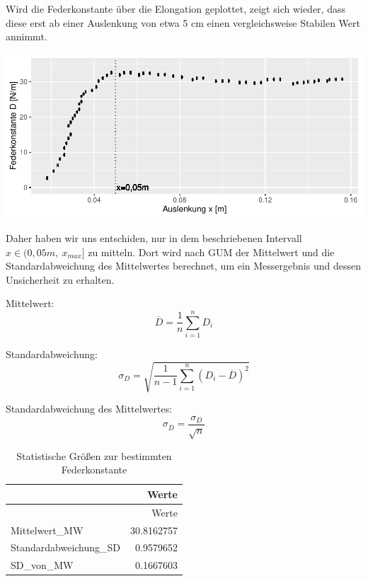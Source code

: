 \documentclass[
  9pt,
]{article}
\begin{document}
Wird die Federkonstante über die Elongation geplottet, zeigt sich
wieder, dass diese erst ab einer Auslenkung von etwa 5 cm einen
vergleichsweise Stabilen Wert annimmt.

\begin{center}\includegraphics{DehnbareStoffe_files/figure-latex/unnamed-chunk-9-1} \end{center}

Daher haben wir uns entschiden, nur in dem beschriebenen Intervall
\(x \in (0,05m,\ x_{max}]\) zu mitteln. Dort wird nach GUM der
Mittelwert und die Standardabweichung des Mittelwertes berechnet, um ein
Messergebnis und dessen Unsicherheit zu erhalten.

Mittelwert: \begin{equation}\label{Mittelwert}
\overline{D} = \frac{1}{n}\sum \limits_{i=1}^nD_i
\end{equation}

Standardabweichung: \begin{equation}\label{Standardabweichung}
\sigma_D = \sqrt{\frac{1}{n-1} \sum_{i=1}^n (D_i - \overline{D})^2}
\end{equation}

Standardabweichung des Mittelwertes:
\begin{equation}\label{StandardabweichungDesMittelwertes}
\sigma_{\overline{D}}=\frac{\sigma_D}{\sqrt{n}}
\end{equation}

\begin{longtable}[]{@{}lr@{}}
\caption{Statistische Größen zur bestimmten
Federkonstante}\tabularnewline
\toprule()
& Werte \\
\midrule()
\endfirsthead
\toprule()
& Werte \\
\midrule()
\endhead
Mittelwert\_MW & 30.8162757 \\
Standardabweichung\_SD & 0.9579652 \\
SD\_von\_MW & 0.1667603 \\
\bottomrule()
\end{longtable}
\end{document}
